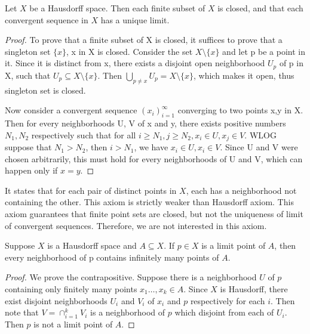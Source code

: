 \documentclass[11pt,a4paper]{article}
\begin{document}
\begin{proposition}
    Let $X$ be a Hausdorff space. Then each finite subset of $X$ is closed, and that each convergent sequence in $X$ has a unique limit.
\end{proposition}

\begin{proof}
    To prove that a finite subset of X is closed, it suffices to prove that a singleton set $\{x\}$, x in X is closed. Consider the set $X\setminus\{x\}$ and let p be a point in it. Since it is distinct from x, there exists a disjoint open neighborhood $U_p$ of p in X, such that $U_p\subseteq X\setminus\{x\}$. Then $\underset{p\neq x}{\bigcup}U_p = X\setminus\{x\}$, which makes it open, thus singleton set is closed. 

    Now consider a convergent sequence $(x_i)_{i=1}^\infty$ converging to two points x,y in X. Then for every neighborhoods U, V of x and y, there exists positive numbers $N_1, N_2$ respectively such that for all $i\ge N_1, j\ge N_2, x_i\in U, x_j\in V$. WLOG suppose that $N_1>N_2$, then $i>N_1$, we have $x_i\in U, x_i\in V$. Since U and V were chosen arbitrarily, this must hold for every neighborhoods of U and V, which can happen only if $x=y$. 
\end{proof}

\begin{remark}[$T_1$-axiom]
It states that for each pair of distinct points in $X$, each has a neighborhood not containing the other. This axiom is strictly weaker than Hausdorff axiom. This axiom guarantees that finite point sets are closed, but not the uniqueness of limit of convergent sequences. Therefore, we are not interested in this axiom.
\end{remark}

\begin{proposition}\label{prop:limit_point_infinite_intersection}
Suppose $X$ is a Hausdorff space and $A\subseteq X$. If $p\in X$ is a limit point of $A$, then every neighborhood of p contains infinitely many points of $A$.
\end{proposition}

\begin{proof}
We prove the contrapositive. Suppose there is a neighborhood $U$ of $p$ containing only finitely many points $x_1\ldots,x_k\in A$. Since $X$ is Hausdorff, there exist disjoint neighborhoods $U_i$ and $V_i$ of $x_i$ and $p$ respectively for each $i$. Then note that $V = \cap_{i=1}^k V_i$ is a neighborhood of $p$ which disjoint from each of $U_i$. Then $p$ is not a limit point of $A$.
\end{proof}
\end{document}
